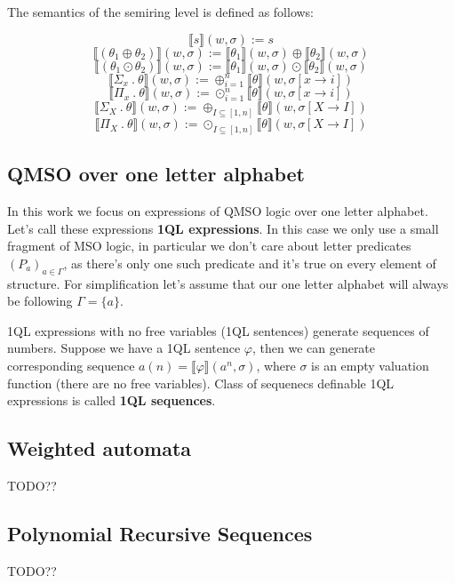 \documentclass[12pt]{article}
\theoremstyle{definition}
\begin{document}
The semantics of the semiring level is defined as follows:

$$\llbracket s\rrbracket(w, \sigma) := s$$
$$\llbracket(\theta_1 \oplus \theta_2)\rrbracket(w, \sigma) := \llbracket\theta_1\rrbracket(w, \sigma) \oplus \llbracket\theta_2\rrbracket(w, \sigma)$$
$$\llbracket(\theta_1 \odot \theta_2)\rrbracket(w, \sigma) := \llbracket\theta_1\rrbracket(w, \sigma) \odot \llbracket\theta_2\rrbracket(w, \sigma)$$
$$\llbracket \Sigma_x \ . \ \theta \rrbracket(w, \sigma) := \oplus^n_{i=1}\llbracket \theta \rrbracket (w, \sigma[x \rightarrow i])$$
$$\llbracket \Pi_x \ . \ \theta \rrbracket(w, \sigma) := \odot^n_{i=1}\llbracket \theta \rrbracket (w, \sigma[x \rightarrow i])$$
$$\llbracket \Sigma_X \ . \ \theta \rrbracket(w, \sigma) := \oplus_{I \subseteq [1,n]}\llbracket \theta \rrbracket (w, \sigma[X \rightarrow I])$$
$$\llbracket \Pi_X \ . \ \theta \rrbracket(w, \sigma) := \odot_{I \subseteq [1,n]}\llbracket \theta \rrbracket (w, \sigma[X \rightarrow I])$$

\subsection{QMSO over one letter alphabet}

In this work we focus on expressions of QMSO logic over one letter alphabet. Let's call these expressions \textbf{1QL expressions}. In this case we only use a small fragment of MSO logic, in particular we don't care about letter predicates $(P_a)_{a \in \Gamma}$, as there's only one such predicate and it's true on every element of structure. For simplification let's assume that our one letter alphabet will always be following $\Gamma = \{a\}$.

1QL expressions with no free variables (1QL sentences) generate sequences of numbers. Suppose we have a 1QL sentence $\varphi$, then we can generate corresponding sequence $a(n) = \llbracket \varphi \rrbracket (a^n, \sigma)$, where $\sigma$ is an empty valuation function (there are no free variables). Class of sequenecs definable 1QL expressions is called \textbf{1QL sequences}.

\subsection{Weighted automata}
TODO??

\subsection{Polynomial Recursive Sequences}
TODO??
\end{document}
